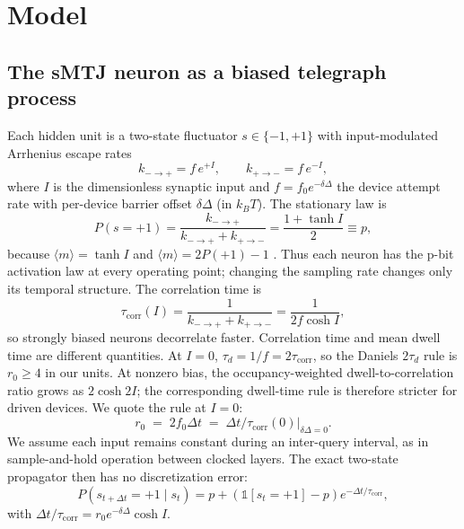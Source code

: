 \documentclass{ieeeaccess}
\newcommand{\rzero}{r_0}
\newcommand{\tauc}{\tau_{\mathrm{corr}}}
\begin{document}
\section{Model}
\label{sec:model}

\subsection{The sMTJ neuron as a biased telegraph process}
Each hidden unit is a two-state fluctuator $s \in \{-1,+1\}$ with
input-modulated Arrhenius escape rates
\begin{equation}
k_{-\to+} = f\, e^{+I}, \qquad k_{+\to-} = f\, e^{-I},
\label{eq:rates}
\end{equation}
where $I$ is the dimensionless synaptic input and $f = f_0 e^{-\delta
\Delta}$ the device attempt rate with per-device barrier offset
$\delta\Delta$ (in $k_BT$). The stationary law is
\begin{equation}
P(s{=}{+}1) = \frac{k_{-\to+}}{k_{-\to+}+k_{+\to-}} = \frac{1+\tanh I}{2}
\equiv p,
\label{eq:peq}
\end{equation}
because $\langle m\rangle=\tanh I$ and $\langle m\rangle=2P(+1)-1$
\cite{camsari2017stochastic}. Thus each neuron has the p-bit activation
law at every operating point; changing the sampling rate changes only its
temporal structure. The correlation time is
\begin{equation}
\tauc(I) = \frac{1}{k_{-\to+}+k_{+\to-}} = \frac{1}{2f\cosh I},
\label{eq:tauc}
\end{equation}
so strongly biased neurons decorrelate faster. Correlation time and mean
dwell time are different quantities. At $I{=}0$,
$\tau_d=1/f=2\tauc$, so the Daniels $2\tau_d$ rule
\cite{daniels2020energy} is $\rzero\geq4$ in our units. At nonzero bias,
the occupancy-weighted dwell-to-correlation ratio grows as $2\cosh2I$;
the corresponding dwell-time rule is therefore stricter for driven
devices. We quote the rule at $I{=}0$:
\begin{equation}
\rzero \;=\; 2 f_0 \Delta t \;=\; \Delta t/\tauc(0)\big|_{\delta\Delta=0}.
\end{equation}
We assume each input remains constant during an inter-query interval, as in
sample-and-hold operation between clocked layers. The exact two-state
propagator then has no discretization error:
\begin{equation}
P(s_{t+\Delta t}{=}{+}1 \mid s_t) = p + \left(\mathbb{1}[s_t{=}{+}1] -
p\right) e^{-\Delta t/\tauc},
\label{eq:propagator}
\end{equation}
with $\Delta t/\tauc = \rzero e^{-\delta\Delta}\cosh I$.
\end{document}

